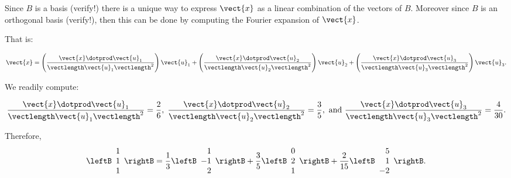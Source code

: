 \begin{solution}
Since $B$ is a basis (verify!) there is a unique way to express $\vect{x}$ as a
linear combination of the vectors of $B$. Moreover since $B$ is an
orthogonal basis (verify!), then this can be done by computing the
Fourier expansion of $\vect{x}$.

That is:

\[ 
\vect{x}   = 
\left(\frac{\vect{x}\dotprod \vect{u}_1}{\vectlength \vect{u}_1 \vectlength^2}\right) \vect{u}_1 +
\left(\frac{\vect{x}\dotprod \vect{u}_2}{\vectlength \vect{u}_2 \vectlength^2}\right) \vect{u}_2 +
\left(\frac{\vect{x}\dotprod \vect{u}_3}{\vectlength \vect{u}_3 \vectlength^2}\right) \vect{u}_3.
\]

We readily compute: 

\[
\frac{\vect{x}\dotprod\vect{u}_1}{\vectlength \vect{u}_1 \vectlength^2} = \frac{2}{6}, \; 
\frac{\vect{x}\dotprod\vect{u}_2}{\vectlength \vect{u}_2 \vectlength^2} = \frac{3}{5},
\mbox{ and }
\frac{\vect{x}\dotprod\vect{u}_3}{\vectlength \vect{u}_3 \vectlength^2} = \frac{4}{30}.\]

Therefore, 
\[ \leftB\begin{array}{r} 1 \\ 1 \\ 1 \end{array}\rightB
= \frac{1}{3}\leftB\begin{array}{r} 1 \\ -1 \\ 2 \end{array}\rightB
+\frac{3}{5}\leftB\begin{array}{r} 0 \\ 2 \\ 1  \end{array}\rightB
+\frac{2}{15}\leftB\begin{array}{r} 5 \\ 1 \\ -2 \end{array}\rightB.\]
\end{solution}